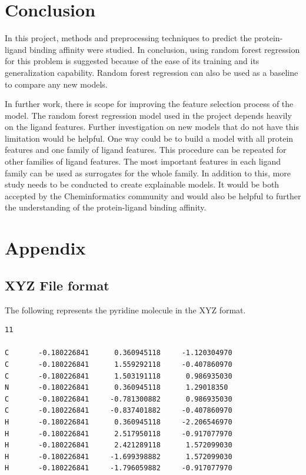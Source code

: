 \documentclass[11pt]{article}
\begin{document}
\section{Conclusion}
In this project, methods and preprocessing techniques to predict the protein-ligand binding affinity were studied.
In conclusion, using random forest regression for this problem is suggested because of the ease of its training and its generalization capability.
Random forest regression can also be used as a baseline to compare any new models.

In further work,  there is scope for improving the feature selection process of the model.
The random forest regression model used in the project depends heavily on the ligand features.
Further investigation on new models that do not have this limitation would be helpful.
One way could be to build a model with all protein features and one family of ligand features. This procedure can be repeated for other families of ligand features.
The most important features in each ligand family can be used as surrogates for the whole family.
In addition to this, more study needs to be conducted to create explainable models.
It would be both accepted by the Cheminformatics community and would also be helpful to further the understanding of the protein-ligand binding affinity.




\section{Appendix}
\subsection{XYZ File format}
\label{XYZFileexampleref}
The following represents the pyridine molecule in the XYZ format.
\begin{verbatim}
11

C       -0.180226841      0.360945118     -1.120304970
C       -0.180226841      1.559292118     -0.407860970
C       -0.180226841      1.503191118      0.986935030
N       -0.180226841      0.360945118      1.29018350
C       -0.180226841     -0.781300882      0.986935030
C       -0.180226841     -0.837401882     -0.407860970
H       -0.180226841      0.360945118     -2.206546970
H       -0.180226841      2.517950118     -0.917077970
H       -0.180226841      2.421289118      1.572099030
H       -0.180226841     -1.699398882      1.572099030
H       -0.180226841     -1.796059882     -0.917077970
\end{verbatim}
\end{document}
